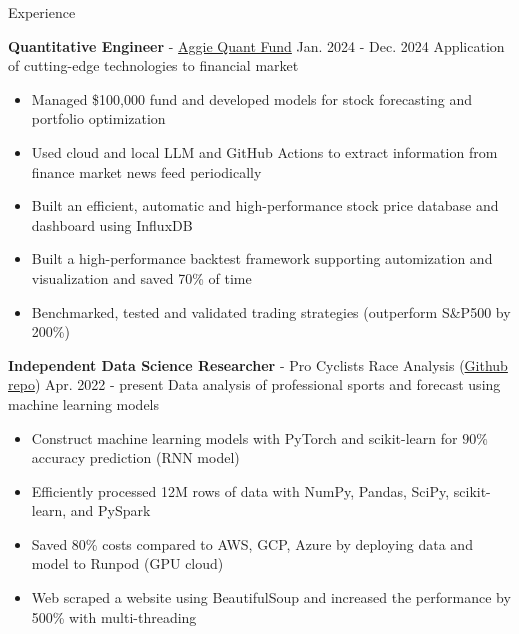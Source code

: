 \documentclass{resume}
\begin{document}
\begin{rSection}{Experience}
    \vspace{0.4em}
    \item \textbf{Quantitative Engineer} - \href{https://www.linkedin.com/company/aggieqf}{Aggie Quant Fund} \hfill Jan. 2024 - Dec. 2024
        \newline\hspace*{0.5em} {\normalsize Application of cutting-edge technologies to financial market}
        \begin{itemize}
        \item Managed \$100,000 fund and developed models for stock forecasting and portfolio optimization
        \item Used cloud and local LLM and GitHub Actions to extract information from finance market news feed periodically
        \item Built an efficient, automatic and high-performance stock price database and dashboard using InfluxDB
        \item Built a high-performance backtest framework supporting automization and visualization and saved 70\% of time
        \item Benchmarked, tested and validated trading strategies (outperform S\&P500 by 200\%)
        \end{itemize}

    \vspace{0.4em}
    \item \textbf{Independent Data Science Researcher} - {Pro Cyclists Race Analysis} (\href{https://github.com/noctildon/pro_cyclists}{Github repo}) \hfill Apr. 2022 - present
        \newline\hspace*{0.5em} {\normalsize Data analysis of professional sports and forecast using machine learning models}
        \begin{itemize}
        \item Construct machine learning models with PyTorch and scikit-learn for $90\%$ accuracy prediction (RNN model)
        \item Efficiently processed 12M rows of data with NumPy, Pandas, SciPy, scikit-learn, and PySpark
        \item Saved 80\% costs compared to AWS, GCP, Azure by deploying data and model to Runpod (GPU cloud)
        \item Web scraped a website using BeautifulSoup and increased the performance by 500\% with multi-threading
        \end{itemize}


\end{rSection}
\end{document}
